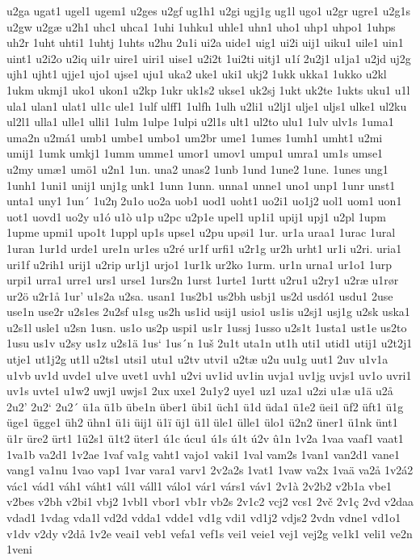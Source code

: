 u2ga
ugat1
ugel1
ugem1
u2ges
u2gf
ug1h1
u2gi
ugj1g
ug1l
ugo1
u2gr
ugre1
u2g1s
u2gw
u2gæ
u2h1
uhc1
uhca1
1uhi
1uhku1
uhle1
uhn1
uho1
uhp1
uhpo1
1uhps
uh2r
1uht
uhti1
1uhtj
1uhts
u2hu
2u1i
ui2a
uide1
uig1
ui2i
uij1
uiku1
uile1
uin1
uint1
u2i2o
u2iq
ui1r
uire1
uiri1
uise1
u2i2t
1ui2ti
uitj1
u1í
2u2j1
u1ja1
u2jd
uj2g
ujh1
ujht1
ujje1
ujo1
ujse1
uju1
uka2
uke1
uki1
ukj2
1ukk
ukka1
1ukko
u2kl
1ukm
ukmj1
uko1
ukon1
u2kp
1ukr
uk1s2
ukse1
uk2sj
1ukt
uk2te
1ukts
uku1
u1l
ula1
ulan1
ulat1
ul1c
ule1
1ulf
ulff1
1ulfh
1ulh
u2li1
u2lj1
ulje1
uljs1
ulke1
ul2ku
ul2l1
ulla1
ulle1
ulli1
1ulm
1ulpe
1ulpi
u2l1s
ult1
ul2to
ulu1
1ulv
ulv1s
1uma1
uma2n
u2má1
umb1
umbe1
umbo1
um2br
ume1
1umes
1umh1
umht1
u2mi
umij1
1umk
umkj1
1umm
umme1
umor1
umov1
umpu1
umra1
um1s
umse1
u2my
umæ1
umö1
u2n1
1un.
una2
unas2
1unb
1und
1une2
1une.
1unes
ung1
1unh1
1uni1
unij1
unj1g
unk1
1unn
1unn.
unna1
unne1
uno1
unp1
1unr
unst1
unta1
uny1
1un´
1u2ŋ
2u1o
uo2a
uob1
uod1
uoht1
uo2i1
uo1j2
uol1
uom1
uon1
uot1
uovd1
uo2y
u1ó
u1ò
u1p
u2pc
u2p1e
upel1
up1i1
upij1
upj1
u2pl
1upm
1upme
upmi1
upo1t
1uppl
up1s
upse1
u2pu
upøi1
1ur.
ur1a
uraa1
1urac
1ural
1uran
1ur1d
urde1
ure1n
ur1es
u2ré
ur1f
urfi1
u2r1g
ur2h
urht1
ur1i
u2ri.
uria1
uri1f
u2rih1
urij1
u2rip
ur1j1
urjo1
1ur1k
ur2ko
1urm.
ur1n
urna1
ur1o1
1urp
urpi1
urra1
urre1
urs1
urse1
1urs2n
1urst
1urte1
1urtt
u2ru1
u2ry1
u2ræ
u1rør
ur2ö
u2r1å
1ur'
u1s2a
u2sa.
usan1
1us2b1
us2bh
usbj1
us2d
usdó1
usdu1
2use
use1n
use2r
u2s1es
2u2sf
u1sg
us2h
us1id
usij1
usio1
us1is
u2sj1
usj1g
u2sk
uska1
u2s1l
usle1
u2sn
1usn.
us1o
us2p
uspi1
us1r
1ussj
1usso
u2s1t
1usta1
ust1e
us2to
1usu
us1v
u2sy
us1z
u2s1ä
1us`
1us´n
1uš
2u1t
uta1n
ut1h
uti1
utid1
utij1
u2t2j1
utje1
ut1j2g
ut1l
u2ts1
utsi1
utu1
u2tv
utvi1
u2tæ
u2u
uu1g
uut1
2uv
u1v1a
u1vb
uv1d
uvde1
u1ve
uvet1
uvh1
u2vi
uv1id
uv1in
uvja1
uv1jg
uvjs1
uv1o
uvri1
uv1s
uvte1
u1w2
uwj1
uwjs1
2ux
uxe1
2u1y2
uye1
uz1
uza1
u2zi
u1æ
u1ä
u2å
2u2'
2u2`
2u2´
ü1a
ü1b
übe1n
über1
übi1
üch1
ü1d
üda1
ü1e2
üei1
üf2
üft1
ü1g
üge1
ügge1
üh2
ühn1
ü1i
üij1
ü1ï
üj1
ü1l
üle1
ülle1
ülo1
ü2n2
üner1
ü1nk
ünt1
ü1r
üre2
ürt1
1ü2s1
ü1t2
üter1
ú1c
úcu1
ú1s
ú1t
ú2v
û1n
1v2a
1vaa
vaaf1
vaat1
1va1b
va2d1
1v2ae
1vaf
va1g
vaht1
vajo1
vaki1
1val
vam2s
1van1
van2d1
vane1
vang1
va1nu
1vao
vap1
1var
vara1
varv1
2v2a2s
1vat1
1vaw
va2x
1vaä
va2å
1v2á2
vác1
vád1
váh1
váht1
vál1
váll1
válo1
vár1
várs1
váv1
2v1à
2v2b2
v2b1a
vbe1
v2bes
v2bh
v2bi1
vbj2
1vbl1
vbor1
vb1r
vb2s
2v1c2
vcj2
vcs1
2vč
2v1ç
2vd
v2daa
vdad1
1vdag
vda1l
vd2d
vdda1
vdde1
vd1g
vdi1
vd1j2
vdjs2
2vdn
vdne1
vd1o1
v1dv
v2dy
v2då
1v2e
veai1
veb1
vefa1
vef1s
vei1
veie1
vej1
vej2g
ve1k1
veli1
ve2n
1veni
